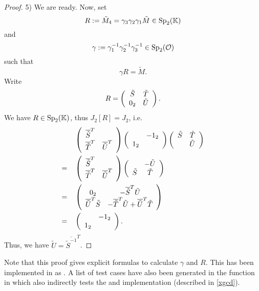 \begin{lemma}[$solveR$]
\begin{proof}
5) We are ready. Now, set
\[ R := \tilde{M}_4 = \gamma_3 \gamma_2 \gamma_1 \tilde{M} \in \operatorname{Sp}_2(\mathbb{K}) \]
and
\[ \gamma :=  \gamma_1^{-1} \gamma_2^{-1} \gamma_3^{-1} \in \operatorname{Sp}_2(\mathcal{O}) \]
such that
\[ \gamma R = \tilde{M} . \]
Write
\[ R = \left( \begin{array}{cc} \tilde{S} & \tilde{T} \\ 0_2 & \tilde{U} \end{array} \right) . \]
We have $R \in \operatorname{Sp}_2(\mathbb{K})$, thus $J_2[R] = J_2$, i.e.
\begin{align*}
&\SimpleMatrix{\overline{\tilde{S}}^T}{}{\overline{\tilde{T}}^T}{\overline{\tilde{U}}^T}
\SimpleMatrix{}{-1_2}{1_2}{}
\SimpleMatrix{\tilde{S}}{\tilde{T}}{}{\tilde{U}} \\
=\quad & \SimpleMatrix{\overline{\tilde{S}}^T}{}{\overline{\tilde{T}}^T}{\overline{\tilde{U}}^T}
\SimpleMatrix{}{-\tilde{U}}{\tilde{S}}{\tilde{T}} \\
=\quad & \SimpleMatrix{0_2}{-\overline{\tilde{S}}^T \tilde{U}}{\overline{\tilde{U}}^T \tilde{S}}{%
-\overline{\tilde{T}}^T \tilde{U} + \overline{\tilde{U}}^T \tilde{T} } \\
=\quad & \SimpleMatrix{}{-1_2}{1_2}{} .
\end{align*}
Thus, we have $\tilde{U} = \overline{\tilde{S}^{-1}}^T$.
\end{proof}
\end{lemma}
Note that this proof gives explicit formulas to calculate $\gamma$ and $R$. This has been implemented in  as . A list of test cases have also been generated in the function  in  which also indirectly tests the  and  implementation (described in \cref{xgcd}).

